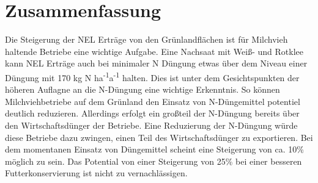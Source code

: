 
\section{Zusammenfassung}
\label{sec:Zusammenfassung}

Die Steigerung der \ac{NEL} Erträge von den Grünlandflächen ist für Milchvieh haltende Betriebe eine wichtige Aufgabe.
Eine Nachsaat mit Weiß- und Rotklee kann \ac{NEL} Erträge auch bei minimaler N Düngung etwas über dem Niveau einer Düngung mit 170 kg N ha\textsuperscript{-1}a\textsuperscript{-1} halten.
Dies ist unter dem Gesichtspunkten der höheren Auflagne an die N-Düngung eine wichtige Erkenntnis.
So können Milchviehbetriebe auf dem Grünland den Einsatz von N-Düngemittel potentiel deutlich reduzieren.
Allerdings erfolgt ein großteil der N-Düngung bereits über den Wirtschaftsdünger der Betriebe.
Eine Reduzierung der N-Düngung würde diese Betriebe dazu zwingen, einen Teil des Wirtschaftsdünger zu exportieren.
Bei dem momentanen Einsatz von Düngemittel scheint eine Steigerung von ca. 10\% möglich zu sein.
Das Potential von einer Steigerung von 25\% bei einer besseren Futterkonservierung ist nicht zu vernachlässigen.
